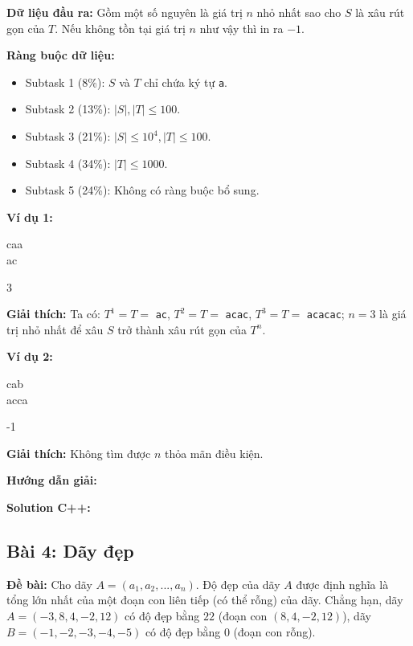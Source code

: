 \documentclass[12pt]{scrartcl}  %
\begin{document}
\textbf{Dữ liệu đầu ra:}
Gồm một số nguyên là giá trị $n$ nhỏ nhất sao cho $S$ là xâu rút gọn của $T$. Nếu không tồn tại giá trị $n$ như vậy thì in ra $-1$.

\textbf{Ràng buộc dữ liệu:}
\begin{itemize}
    \item Subtask 1 (8\%): $S$ và $T$ chỉ chứa ký tự \texttt{a}.
    \item Subtask 2 (13\%): $|S|, |T| \leq 100$.
    \item Subtask 3 (21\%): $|S| \leq 10^4, |T| \leq 100$.
    \item Subtask 4 (34\%): $|T| \leq 1000$.
    \item Subtask 5 (24\%): Không có ràng buộc bổ sung.
\end{itemize}

\textbf{Ví dụ 1:}
\begin{tcolorbox}[colback=gray!5!white, colframe=blue!50!black, title=Input]
caa\\
ac
\end{tcolorbox}
\begin{tcolorbox}[colback=gray!5!white, colframe=green!50!black, title=Output]
3
\end{tcolorbox}

\textbf{Giải thích:}
Ta có: $T^1 = T =$ \texttt{ac}, $T^2 = T =$ \texttt{acac}, $T^3 = T =$ \texttt{acacac}; $n = 3$ là giá trị nhỏ nhất để xâu $S$ trở thành xâu rút gọn của $T^n$.

\textbf{Ví dụ 2:}
\begin{tcolorbox}[colback=gray!5!white, colframe=blue!50!black, title=Input]
cab\\
acca
\end{tcolorbox}
\begin{tcolorbox}[colback=gray!5!white, colframe=green!50!black, title=Output]
-1
\end{tcolorbox}

\textbf{Giải thích:} 
Không tìm được $n$ thỏa mãn điều kiện.

\textbf{Hướng dẫn giải:}

\textbf{Solution C++:}

\subsection{Bài 4: Dãy đẹp}

\textbf{Đề bài:}
Cho dãy $A = (a_1, a_2, ... , a_n)$. Độ đẹp của dãy $A$ được định nghĩa là tổng lớn nhất của một đoạn con liên tiếp (có thể rỗng) của dãy. Chẳng hạn, dãy 
$A = (-3, 8, 4, -2, 12)$ có độ đẹp bằng $22$ (đoạn con $(8, 4, -2, 12)$), dãy $B = (-1, -2, -3, -4, -5)$ có độ đẹp bằng $0$ (đoạn con rỗng).
\end{document}
